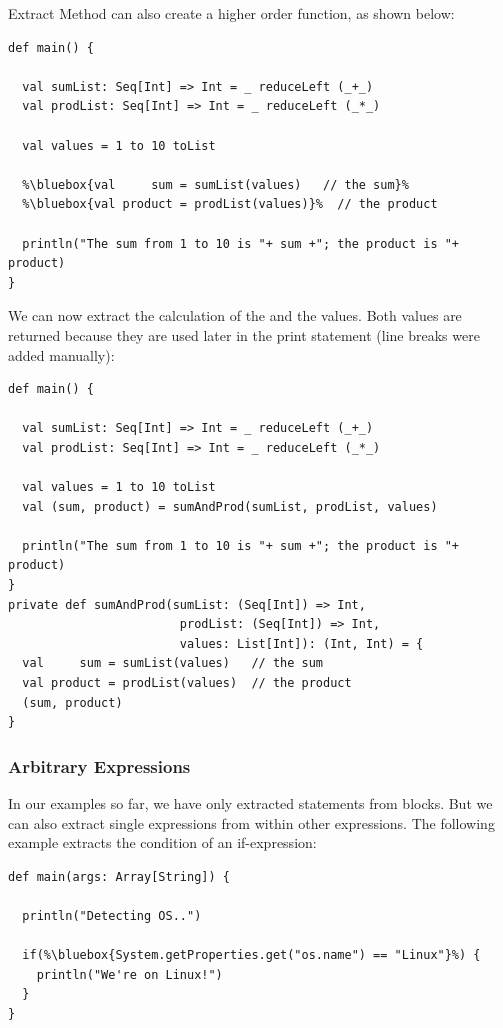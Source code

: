 \documentclass[10pt,a4paper,oneside]{scrreprt}
\begin{document}
Extract Method can also create a higher order function, as shown below:

\begin{lstlisting}  
def main() {
  
  val sumList: Seq[Int] => Int = _ reduceLeft (_+_)
  val prodList: Seq[Int] => Int = _ reduceLeft (_*_)
  
  val values = 1 to 10 toList
  
  %\bluebox{val     sum = sumList(values)   // the sum}%
  %\bluebox{val product = prodList(values)}%  // the product

  println("The sum from 1 to 10 is "+ sum +"; the product is "+ product)
}
\end{lstlisting}

We can now extract the calculation of the  and the  values. Both values are returned because they are used later in the print statement (line breaks were added manually):

\begin{lstlisting}
def main() {
  
  val sumList: Seq[Int] => Int = _ reduceLeft (_+_)
  val prodList: Seq[Int] => Int = _ reduceLeft (_*_)
  
  val values = 1 to 10 toList
  val (sum, product) = sumAndProd(sumList, prodList, values)

  println("The sum from 1 to 10 is "+ sum +"; the product is "+ product)
}
private def sumAndProd(sumList: (Seq[Int]) => Int, 
                        prodList: (Seq[Int]) => Int, 
                        values: List[Int]): (Int, Int) = {
  val     sum = sumList(values)   // the sum
  val product = prodList(values)  // the product
  (sum, product)
}
\end{lstlisting}

\subsubsection{Arbitrary Expressions}

In our examples so far, we have only extracted statements from blocks. But we can also extract single expressions from within other expressions. The following example extracts the condition of an if-expression:

\begin{lstlisting}
def main(args: Array[String]) {

  println("Detecting OS..")
  
  if(%\bluebox{System.getProperties.get("os.name") == "Linux"}%) {
    println("We're on Linux!")
  }
}
\end{lstlisting}
\end{document}
